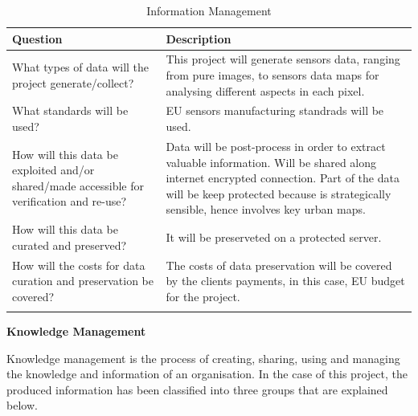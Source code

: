 \begin{longtable}[H]{p{7cm} p{7cm}}
		
		\toprule[2pt]
		
		\textbf{Question} &  \textbf{Description}\\
		
		\midrule [1.5pt]
		\endhead
		
		What types of data will the project generate/collect?  & This project will generate sensors data, ranging from pure images, to sensors data maps for analysing different aspects in each pixel.\vspace{0.2cm}\\
		
		\midrule
		
		What standards will be used?  & EU sensors manufacturing standrads will be used.\vspace{0.2cm}\\
		
		\midrule
		
		How will this data be exploited and/or shared/made accessible for verification and re-use? & Data will be post-process in order to extract valuable information. Will be shared along internet encrypted connection. Part of the data will be keep protected because is strategically sensible, hence involves key urban maps.\vspace{0.2cm}\\
		
		\midrule
		
		How will this data be curated and preserved? & It will be preserveted on a protected server.\vspace{0.2cm}\\
		
		\midrule
		
		How will the costs for data curation and preservation be covered? & The costs of data preservation will be covered by the clients payments, in this case, EU budget for the project.\vspace{0.2cm}\\	
		
		\bottomrule[2pt]
		
	\caption{Information Management}
\end{longtable}

\textbf{Knowledge Management}

Knowledge management is the process of creating, sharing, using and managing the knowledge and information of an organisation. In the case of this project, the produced information has been classified into three groups that are explained below.

